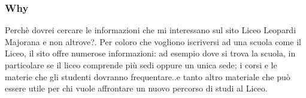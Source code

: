 \documentclass[12pt]{article}
\begin{document}
\subsubsection{Why} Perch\`e dovrei cercare le informazioni che mi interessano sul sito Liceo Leopardi Majorana e non altrove?. Per coloro che vogliono iscriversi ad una scuola come il Liceo, il sito offre numerose informazioni:
ad esempio dove si trova la scuola, in particolare se il liceo comprende pi\`u sedi oppure un unica sede; i corsi e le materie che gli studenti dovranno frequentare..e tanto altro materiale che pu\`o essere utile per chi vuole affrontare un nuovo percorso di studi al Liceo.
\end{document}
